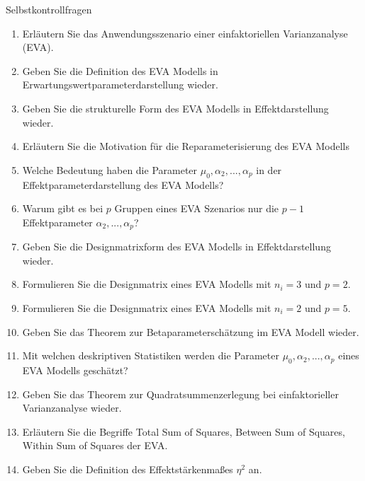 \documentclass[
  8pt,
  ignorenonframetext,
]{beamer}
\begin{document}
\begin{frame}{Selbstkontrollfragen}
\protect\hypertarget{selbstkontrollfragen}{}
\footnotesize
\begin{enumerate}
\itemsep1mm
\item Erläutern Sie das Anwendungsszenario einer einfaktoriellen Varianzanalyse (EVA).
\item Geben Sie die Definition des EVA Modells in Erwartungswertparameterdarstellung wieder.
\item Geben Sie die strukturelle Form des EVA Modells in Effektdarstellung wieder.
\item Erläutern Sie die Motivation für die Reparameterisierung des EVA Modells
\item Welche Bedeutung haben die Parameter $\mu_0,\alpha_2,...,\alpha_p$ in der Effektparameterdarstellung des EVA Modells?
\item Warum gibt es bei $p$ Gruppen eines EVA Szenarios nur die $p-1$ Effektparameter $\alpha_2,...,\alpha_p$?
\item Geben Sie die Designmatrixform des EVA Modells in Effektdarstellung wieder.
\item Formulieren Sie die Designmatrix eines EVA Modells mit $n_i = 3$ und $p = 2$.
\item Formulieren Sie die Designmatrix eines EVA Modells mit $n_i = 2$ und $p = 5$.
\item Geben Sie das Theorem zur Betaparameterschätzung im EVA Modell wieder.
\item Mit welchen deskriptiven Statistiken werden die Parameter $\mu_0,\alpha_2,...,\alpha_p$ eines EVA Modells geschätzt? 
\item Geben Sie das Theorem zur Quadratsummenzerlegung bei einfaktorieller Varianzanalyse wieder.
\item Erläutern Sie die Begriffe Total Sum of Squares, Between Sum of Squares, Within Sum of Squares der EVA.
\item Geben Sie die Definition des Effektstärkenmaßes $\eta^2$ an.
\end{enumerate}
\end{frame}
\end{document}
